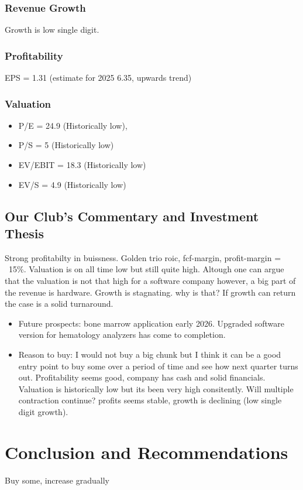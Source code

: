 \documentclass[a4paper, 12pt, oneside]{article} %
\begin{document}
\subsubsection{Revenue Growth}
Growth is low single digit.

\subsubsection{Profitability}
EPS = 1.31 (estimate for 2025 6.35, upwards trend)

\subsubsection{Valuation}
\begin{itemize}
	\item P/E = 24.9 (Historically low),
	\item P/S = 5 (Historically low)
	\item EV/EBIT = 18.3 (Historically low)
	\item EV/S = 4.9 (Historically low)
\end{itemize}


\subsection{Our Club's Commentary and Investment Thesis}
Strong profitabilty in buissness. Golden trio roic, fcf-margin, profit-margin = ~15\%. Valuation is on all time low but still quite high. Altough one can argue that the valuation is not that high for a software company however, a big part of the revenue is hardware. Growth is stagnating. why is that? If growth can return the case is a solid turnaround.
\begin{itemize}
	\item Future prospects: bone marrow application early 2026. Upgraded software version
	      for hematology analyzers has come to completion.
	\item Reason to buy: I would not buy a big chunk but I think it can be a good entry point to buy some over a period of time and see how next quarter turns out. Profitability seems good, company has cash and solid financials. Valuation is historically low but its been very high consitently. Will multiple contraction continue? profits seems stable, growth is declining (low single digit growth).
\end{itemize}

\section{Conclusion and Recommendations}
Buy some, increase gradually
\end{document}
